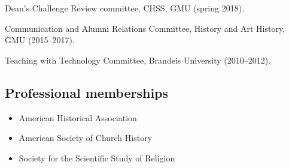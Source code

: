 \documentclass[11pt]{article}
\providecommand{\tightlist}{%
  \setlength{\itemsep}{0pt}\setlength{\parskip}{0pt}}
\begin{document}
Dean's Challenge Review committee, CHSS, GMU (spring 2018).

Communication and Alumni Relations Committee, History and Art History, GMU 
(2015--2017).

Teaching with Technology Committee, Brandeis University (2010--2012).





\subsection{Professional memberships}\label{Memberships}

\begin{itemize}
    \tightlist
    \item American Historical Association
    \item American Society of Church History
    \item Society for the Scientific Study of Religion
\end{itemize}
\end{document}

